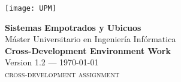 \begin{titlepage}


\texttt{[image: UPM]}


\vfill\vspace{50pt}

\begin{center}
\textbf{\huge Sistemas Empotrados y Ubicuos}\\[\baselineskip]
{\large Máster Universitario en Ingeniería Infórmatica}\\[\baselineskip]
\textbf{\Huge Cross-Development Environment Work}\\[\baselineskip]
{\large Version 1.2 --- \today}\\[\baselineskip]
{\large\textsc{cross-development assignment}}
\end{center}

\vfill


\end{titlepage}
